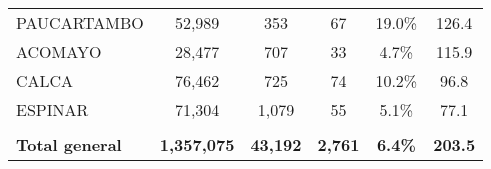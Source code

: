 \begin{tabular}{lccccc}
	\cellcolor[HTML]{FFE699}PAUCARTAMBO                             & 52,989               & 353                        & 67                   & 19.0\%                     & 126.4                                       \\
	\cellcolor[HTML]{FFE699}ACOMAYO                                 & 28,477               & 707                        & 33                   & 4.7\%                      & 115.9                                       \\
	\cellcolor[HTML]{FFE699}CALCA                                   & 76,462               & 725                        & 74                   & 10.2\%                     & 96.8                                        \\
	\cellcolor[HTML]{FFE699}ESPINAR                                 & 71,304               & 1,079                      & 55                   & 5.1\%                      & 77.1                                        \\
	& \multicolumn{1}{l}{} & \multicolumn{1}{l}{}       & \multicolumn{1}{l}{} & \multicolumn{1}{l}{}       & \multicolumn{1}{l}{}                        \\
	\rowcolor[HTML]{DDEBF7} 
	\textbf{Total general}                                          & \textbf{1,357,075}   & \textbf{43,192}            & \textbf{2,761}       & \textbf{6.4\%}             & \textbf{203.5}                             
\end{tabular}
 